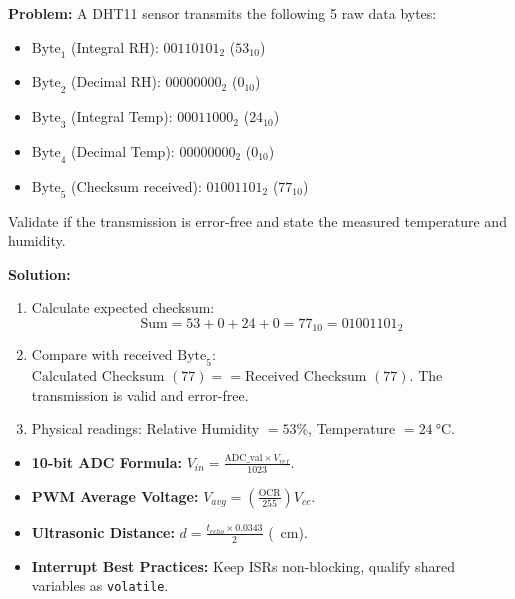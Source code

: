 \begin{examplebox}
\textbf{Problem:} A DHT11 sensor transmits the following 5 raw data bytes:
\begin{itemize}
    \item $\text{Byte}_1$ (Integral RH): $00110101_2$ ($53_{10}$)
    \item $\text{Byte}_2$ (Decimal RH): $00000000_2$ ($0_{10}$)
    \item $\text{Byte}_3$ (Integral Temp): $00011000_2$ ($24_{10}$)
    \item $\text{Byte}_4$ (Decimal Temp): $00000000_2$ ($0_{10}$)
    \item $\text{Byte}_5$ (Checksum received): $01001101_2$ ($77_{10}$)
\end{itemize}
Validate if the transmission is error-free and state the measured temperature and humidity.

\textbf{Solution:}
\begin{enumerate}
    \item Calculate expected checksum:
    \begin{equation}
    \text{Sum} = 53 + 0 + 24 + 0 = 77_{10} = 01001101_2
    \end{equation}
    \item Compare with received $\text{Byte}_5$:
    $\text{Calculated Checksum } (77) == \text{Received Checksum } (77)$.
    The transmission is valid and error-free.
    \item Physical readings: Relative Humidity $= 53\%$, Temperature $= \SI{24}{\celsius}$.
\end{enumerate}
\end{examplebox}

\begin{takeawaybox}
\begin{itemize}
    \item \textbf{10-bit ADC Formula:} $V_{in} = \frac{\text{ADC\_val} \times V_{ref}}{1023}$.
    \item \textbf{PWM Average Voltage:} $V_{avg} = \left( \frac{\text{OCR}}{255} \right) V_{cc}$.
    \item \textbf{Ultrasonic Distance:} $d = \frac{t_{echo} \times 0.0343}{2}$ (\SI{}{\centi\meter}).
    \item \textbf{Interrupt Best Practices:} Keep ISRs non-blocking, qualify shared variables as \texttt{volatile}.
\end{itemize}
\end{takeawaybox}
